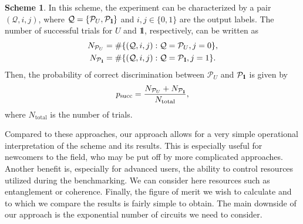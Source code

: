 \documentclass[preprint,12pt, a4paper, dvipsnames]{elsarticle}
\newcommand{\ket}[1]{\ensuremath{|#1\rangle}}
\newcommand{\bra}[1]{\ensuremath{\langle#1|}}
\newcommand{\ketbra}[2]{\ensuremath{\ket{#1}\bra{#2}}}
\newcommand{\proj}[1]{\ensuremath{\ketbra{#1}{#1}}}
\newcommand{\1}{{\rm 1\hspace{-0.9mm}l}}
\newcommand{\Id}{{\rm 1\hspace{-0.9mm}l}}
\newcommand{\PP}{\mathcal{P}}
\newcommand{\QQ}{\mathcal{Q}}
\theoremstyle{definition}
\newtheorem{scheme}{Scheme}
\begin{document}
\begin{scheme}
	In this scheme, the experiment can be characterized by a pair $(\mathcal{Q}, i,j)$, where
	$\mathcal{Q} = \{ \PP_{U}, \PP_{\Id} \}$ and $i,j \in \{0,1\}$ are the output labels. The number
	of successful trials for $U$ and $\Id$, respectively, can be written  as
	\begin{eqnarray}
	N_{\PP_U} &= \#\{(\mathcal{Q},  i, j): \mathcal{Q} = \PP_U, j = 0\}, \\
	N_{\PP_\Id} &= \#\{(\mathcal{Q},  i, j): \mathcal{Q} = \PP_\Id, j = 1\}.
	\end{eqnarray}
	Then, the probability of correct discrimination between $\PP_{U} $ and $\PP_\Id$ is given by
	\begin{equation}
	p_{\text{succ}} = \frac{N_{\PP_{U}} + N_{\PP_{\Id}}}{N_{\text{total}}},
	\end{equation}
	where $N_{\text{total}}$ is the number of trials.
\end{scheme}

Compared to these approaches, our approach allows for a very simple operational
interpretation of the scheme and its results. This is especially useful for
newcomers to the field, who may be put off by more complicated approaches.
Another benefit is, especially for advanced users, the ability to control
resources utilized during the benchmarking. We can consider here resources such
as entanglement or coherence. Finally, the figure of merit we wish to calculate and
to which we compare the results is fairly simple to obtain. The main downside of
our approach is the exponential number of circuits we need to consider.

\end{document}
